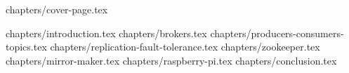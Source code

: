 \documentclass[a4paper,12pt]{article}
\begin{document}
 
 
 

{chapters/cover-page.tex}

\tableofcontents
\clearpage

{chapters/introduction.tex}
{chapters/brokers.tex}
{chapters/producers-consumers-topics.tex}
{chapters/replication-fault-tolerance.tex}
{chapters/zookeeper.tex}
{chapters/mirror-maker.tex}
{chapters/raspberry-pi.tex}
{chapters/conclusion.tex}
 


\end{document}
